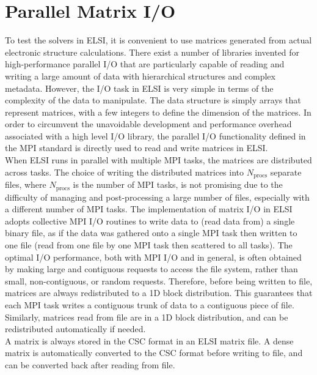 \documentclass{report}
\begin{document}
\section{Parallel Matrix I/O}
\label{sec:rw}
To test the solvers in ELSI, it is convenient to use matrices generated from actual electronic structure calculations.  There exist a number of libraries invented for high-performance parallel I/O that are particularly capable of reading and writing a large amount of data with hierarchical structures and complex metadata.  However, the I/O task in ELSI is very simple in terms of the complexity of the data to manipulate.  The data structure is simply arrays that represent matrices, with a few integers to define the dimension of the matrices.  In order to circumvent the unavoidable development and performance overhead associated with a high level I/O library, the parallel I/O functionality defined in the MPI standard is directly used to read and write matrices in ELSI.\\

When ELSI runs in parallel with multiple MPI tasks, the matrices are distributed across tasks.  The choice of writing the distributed matrices into $N_\text{procs}$ separate files, where $N_\text{procs}$ is the number of MPI tasks, is not promising due to the difficulty of managing and post-processing a large number of files, especially with a different number of MPI tasks.  The implementation of matrix I/O in ELSI adopts collective MPI I/O routines to write data to (read data from) a single binary file, as if the data was gathered onto a single MPI task then written to one file (read from one file by one MPI task then scattered to all tasks).  The optimal I/O performance, both with MPI I/O and in general, is often obtained by making large and contiguous requests to access the file system, rather than small, non-contiguous, or random requests.  Therefore, before being written to file, matrices are always redistributed to a 1D block distribution.  This guarantees that each MPI task writes a contiguous trunk of data to a contiguous piece of file.  Similarly, matrices read from file are in a 1D block distribution, and can be redistributed automatically if needed.\\

A matrix is always stored in the CSC format in an ELSI matrix file.  A dense matrix is automatically converted to the CSC format before writing to file, and can be converted back after reading from file.\\
\end{document}
